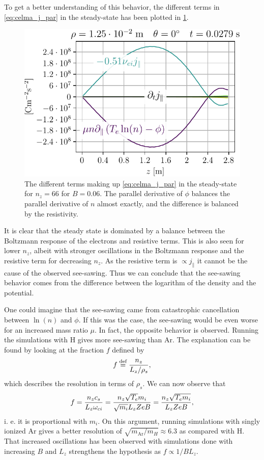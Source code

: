 \noindent
To get a better understanding of this behavior, the different terms in \cref{eq:celma_j_par} in the steady-state has been plotted in \cref{fig:jParBalance}.
%
\begin{figure}[htb]
    \centering
    \includegraphics{fig/results/jParBalanceNy66}
    \caption{The different terms making up \cref{eq:celma_j_par} in the steady-state for $n_z=66$ for $B=0.06$.
        The parallel derivative of $\phi$ balances the parallel derivative of $n$ almost exactly, and the difference is balanced by the resistivity.
    }
    \label{fig:jParBalance}
\end{figure}
%
It is clear that the steady state is dominated by a balance between the Boltzmann response of the electrons and resistive terms.
This is also seen for lower $n_z$, albeit with stronger oscillations in the Boltzmann response and the resistive term for decreasing $n_z$.
As the resistive term is $\propto j_\|$ it cannot be the cause of the observed see-sawing.
Thus we can conclude that the see-sawing behavior comes from the difference between the logarithm of the density and the potential.

One could imagine that the see-sawing came from catastrophic cancellation between $\ln(n)$ and $\phi$.
If this was the case, the see-sawing would be even worse for an increased mass ratio $\mu$.
In fact, the opposite behavior is observed.
Running the simulations with $\text{H}$ gives more see-sawing than $\text{Ar}$.
The explanation can be found by looking at the fraction $f$ defined by
%
\begin{align}
    f \overset{\text{def}}{=} \frac{n_z}{L_z/\rho_s},
    \label{eq:defF}
\end{align}
%
which describes the resolution in terms of $\rho_s$.
We can now observe that
%
\begin{align*}
  f = \frac{n_zc_s}{L_z \omega_{ci}}
    = \frac{n_z\sqrt{T_e}m_i}{\sqrt{m_i} L_z ZeB}
    = \frac{n_z\sqrt{T_em_i}}{L_z ZeB},
\end{align*}
%
i. e. it is proportional with $m_i$.
On this argument, running simulations with singly ionized $\text{Ar}$ gives a better resolution of $\sqrt{m_{\text{Ar}}/m_H}\approx6.3$ as compared with $\text{H}$.
That increased oscillations has been observed with simulations done with increasing $B$ and $L_z$ strengthens the hypothesis as $f\propto 1/BL_z$.

